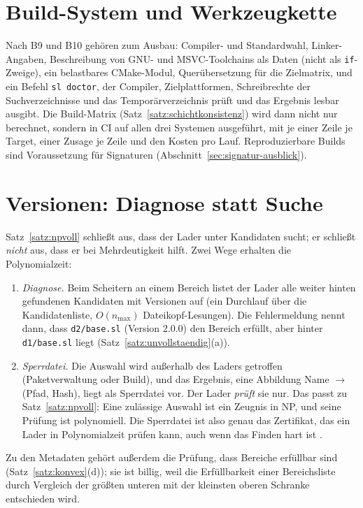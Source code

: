 \section{Build-System und Werkzeugkette}

Nach B9 und B10 gehören zum Ausbau: Compiler- und Standardwahl, Linker-Angaben, Beschreibung von GNU- und MSVC-Toolchains als Daten (nicht als \texttt{if}-Zweige), ein belastbares CMake-Modul, Querübersetzung für die Zielmatrix, und ein Befehl \texttt{sl doctor}, der Compiler, Zielplattformen, Schreibrechte der Suchverzeichnisse und das Temporärverzeichnis prüft und das Ergebnis lesbar ausgibt. Die Build-Matrix (Satz~\ref{satz:schichtkonsistenz}) wird dann nicht nur berechnet, sondern in CI auf allen drei Systemen ausgeführt, mit je einer Zeile je Target, einer Zusage je Zeile und den Kosten pro Lauf. Reproduzierbare Builds sind Voraussetzung für Signaturen (Abschnitt~\ref{sec:signatur-ausblick}).

\section{Versionen: Diagnose statt Suche}

Satz~\ref{satz:npvoll} schließt aus, dass der Lader unter Kandidaten sucht; er schließt \emph{nicht} aus, dass er bei Mehrdeutigkeit hilft. Zwei Wege erhalten die Polynomialzeit:

\begin{enumerate}
	\item \emph{Diagnose.} Beim Scheitern an einem Bereich listet der Lader alle weiter hinten gefundenen Kandidaten mit Versionen auf (ein Durchlauf über die Kandidatenliste, $O(n_{\max})$ Dateikopf-Lesungen). Die Fehlermeldung nennt dann, dass \texttt{d2/base.sl} (Version 2.0.0) den Bereich erfüllt, aber hinter \texttt{d1/base.sl} liegt (Satz~\ref{satz:unvollstaendig}(a)).
	\item \emph{Sperrdatei.} Die Auswahl wird außerhalb des Laders getroffen (Paketverwaltung oder Build), und das Ergebnis, eine Abbildung Name $\to$ (Pfad, Hash), liegt als Sperrdatei vor. Der Lader \emph{prüft} sie nur. Das passt zu Satz~\ref{satz:npvoll}: Eine zulässige Auswahl ist ein Zeugnis in NP, und seine Prüfung ist polynomiell. Die Sperrdatei ist also genau das Zertifikat, das ein Lader in Polynomialzeit prüfen kann, auch wenn das Finden hart ist \cite{cox2016,abate2012}.
\end{enumerate}

Zu den Metadaten gehört außerdem die Prüfung, dass Bereiche erfüllbar sind (Satz~\ref{satz:konvex}(d)); sie ist billig, weil die Erfüllbarkeit einer Bereichsliste durch Vergleich der größten unteren mit der kleinsten oberen Schranke entschieden wird.

